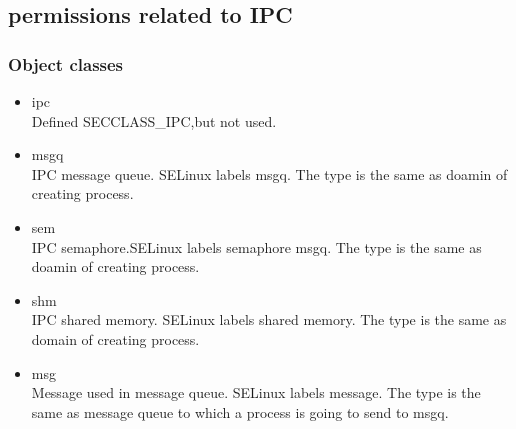 \documentclass{article}
\begin{document}
\subsection{permissions related to IPC}
\subsubsection{Object classes}
\begin{itemize}
 \item ipc \\
       Defined SECCLASS\_IPC,but not used. 
 \item msgq\\
       IPC message queue. SELinux labels  msgq. The type is the
       same as doamin of creating process.
 \item sem\\
       IPC semaphore.SELinux labels semaphore msgq. The type is the
       same as doamin of creating process.
 \item shm\\
       IPC shared memory. SELinux labels shared memory. The type is the
       same as domain of creating process.
 \item msg\\
       Message used in message queue. SELinux labels message. The type
       is the same as message queue to which a process is going to send
       to msgq.
\end{itemize}
\end{document}
